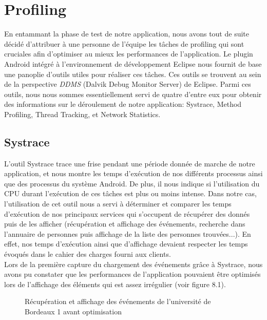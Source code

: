 \chapter{Profiling}
En entammant la phase de test de notre application, nous avons tout de suite décidé d'attribuer à une personne de l'équipe les tâches de profiling qui sont cruciales afin d'optimiser au mieux les performances de l'application. 
Le plugin Android intégré à l'environnement de développement Eclipse nous fournit de base une panoplie d'outils utiles pour réaliser ces tâches. Ces outils se trouvent au sein de la perspective \emph{DDMS} (Dalvik Debug Monitor Server) de Eclipse.
Parmi ces outils, nous nous sommes essentiellement servi de quatre d’entre eux pour obtenir des informations sur le déroulement de notre application: Systrace, Method Profiling, Thread Tracking, et Network Statistics.
 
\section{Systrace}
L'outil Systrace trace une frise pendant une période donnée de marche de notre application, et nous montre les temps d'exécution de nos différents processus ainsi que des processus du système Android. De plus, il nous indique si l'utilisation du CPU durant l'exécution de ces tâches est plus ou moins intense. Dans notre cas, l'utilisation de cet outil nous a servi à déterminer et comparer les temps d'exécution de nos principaux services qui s'occupent de récupérer des donnés puis de les afficher (récupération et affichage des événements, recherche dans l'annuaire de personnes puis affichage de la liste des personnes trouvées...). En effet, nos temps d'exécution ainsi que d'affichage devaient respecter les temps évoqués dans le cahier des charges fourni aux clients. \\
Lors de la première capture du chargement des événements grâce à Systrace, nous avons pu constater que les performances de l'application pouvaient être optimisés lors de l'affichage des éléments qui est assez irrégulier (voir figure 8.1).

\begin{figure}[h!]
  \label{fig:systrace_non_optim}
  \center
  \setlength\fboxsep{5pt}
  \setlength\fboxrule{0.5pt}
  \caption{Récupération et affichage des événements de l'université de Bordeaux 1 avant optimisation}
\end{figure}

